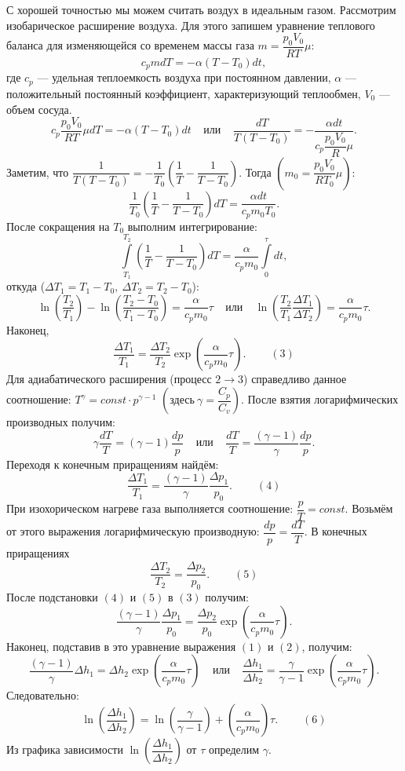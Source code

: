 С хорошей точностью мы можем считать воздух в идеальным газом. Рассмотрим изобарическое расширение воздуха. Для этого запишем уравнение теплового баланса для изменяющейся со временем массы газа $m = \dfrac{p_0 V_0}{RT} \mu$:
$$c_p m dT = -\alpha (T-T_0)dt,$$
где $c_p$ --- удельная теплоемкость воздуха при постоянном давлении, $\alpha$ --- положительный постоянный коэффициент, характеризующий теплообмен, $V_0$ --- объем сосуда.
$$c_p \dfrac{p_0 V_0}{RT} \mu dT = -\alpha (T-T_0)dt ~~~~~ \text{или} ~~~~~ \dfrac{dT}{T(T - T_0)} = - \dfrac{\alpha dt}{c_p \dfrac{p_0 V_0}{R} \mu}.$$
Заметим, что $\dfrac{1}{T(T - T_0)} = -\dfrac{1}{T_0} \left(\dfrac{1}{T}-\dfrac{1}{T-T_0}\right)$. Тогда $\left(m_0 = \dfrac{p_0 V_0}{RT_0} \mu\right)$:$$\dfrac{1}{T_0} \left(\dfrac{1}{T}-\dfrac{1}{T-T_0}\right) dT = \dfrac{\alpha dt}{c_p m_0 T_0}.$$
После сокращения на $T_0$ выполним интегрирование:
$$\int\limits^{T_2}_{T_1}\left(\dfrac{1}{T}-\dfrac{1}{T-T_0}\right) dT = \dfrac{\alpha}{c_p m_0} \int\limits_0^\tau dt,$$ откуда ($\Delta T_1 = T_1 - T_0,~ \Delta T_2 = T_2 - T_0$): $$\ln \left(\dfrac{T_2}{T_1}\right) - \ln \left(\dfrac{T_2 - T_0}{T_1 - T_0}\right) = \dfrac{\alpha}{c_p m_0} \tau~~~~~\text{или}~~~~~ \ln \left(\dfrac{T_2}{T_1} \dfrac{\Delta T_1}{\Delta T_2}\right) = \dfrac{\alpha}{c_p m_0} \tau.$$
Наконец, $$\dfrac{\Delta T_1}{T_1} = \dfrac{\Delta T_2}{T_2} \exp{\left(\dfrac{\alpha}{c_p m_0} \tau\right)}.~~~~~~~~~~(3)$$
Для адиабатического расширения (процесс $2 \longrightarrow 3$) справедливо данное соотношение: $T^{\gamma} = const \cdot p^{\gamma - 1}$ $\left(\text{здесь}~ \gamma = \dfrac{C_p}{C_v}\right)$. После взятия логарифмических производных получим:
$$\gamma \dfrac{dT}{T} = (\gamma - 1)\dfrac{dp}{p} ~~~~~\text{или}~~~~~\dfrac{dT}{T} = \dfrac{(\gamma - 1)}{\gamma}\dfrac{dp}{p}.$$
Переходя к конечным приращениям найдём:
$$\dfrac{\Delta T_1}{T_1} = \dfrac{(\gamma - 1)}{\gamma}\dfrac{\Delta p_1}{p_0}.~~~~~~~~~~(4)$$
При изохорическом нагреве газа выполняется соотношение: $\dfrac{p}{T} = const$. Возьмём от этого выражения логарифмическую производную: $\dfrac{dp}{p} = \dfrac{dT}{T}$. В конечных приращениях
$$\dfrac{\Delta T_2}{T_2} = \dfrac{\Delta p_2}{p_0}.~~~~~~~~~~(5)$$
После подстановки $(4)$ и $(5)$ в $(3)$ получим:
$$\dfrac{(\gamma - 1)}{\gamma}\dfrac{\Delta p_1}{p_0} = \dfrac{\Delta p_2}{p_0} \exp{\left(\dfrac{\alpha}{c_p m_0} \tau\right)}.$$
Наконец, подставив в это уравнение выражения $(1)$ и $(2)$, получим:
$$\dfrac{(\gamma - 1)}{\gamma} \Delta h_1 = \Delta h_2 \exp{\left(\dfrac{\alpha}{c_p m_0} \tau\right)}~~~~~\text{или}~~~~~\dfrac{\Delta h_1}{\Delta h_2} = \dfrac{\gamma}{\gamma - 1} \exp{\left(\dfrac{\alpha}{c_p m_0} \tau\right)}.$$
Следовательно:
$$\ln \left(\dfrac{\Delta h_1}{\Delta h_2}\right) = \ln \left(\dfrac{\gamma}{\gamma - 1}\right) + \left(\dfrac{\alpha}{c_p m_0} \right) \tau.~~~~~~~~~~(6)$$
Из графика зависимости $\ln \left(\dfrac{\Delta h_1}{\Delta h_2}\right)$ от $\tau$ определим $\gamma$.


